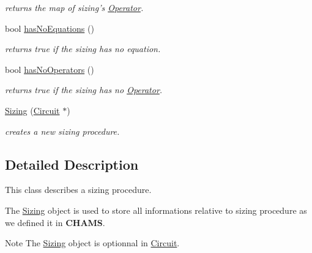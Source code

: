 \begin{DoxyCompactItemize}
\begin{DoxyCompactList}\small\item\em returns the map of sizing's \hyperlink{class_open_chams_1_1_operator}{Operator}. \end{DoxyCompactList}\item 
\hypertarget{class_open_chams_1_1_sizing_a1b6ba7a6c0883f65fa26ad46691946cb}{bool \hyperlink{class_open_chams_1_1_sizing_a1b6ba7a6c0883f65fa26ad46691946cb}{has\-No\-Equations} ()}\label{class_open_chams_1_1_sizing_a1b6ba7a6c0883f65fa26ad46691946cb}

\begin{DoxyCompactList}\small\item\em returns true if the sizing has no equation. \end{DoxyCompactList}\item 
\hypertarget{class_open_chams_1_1_sizing_ac8a299add4fd32ff8bf99c889f4a79a6}{bool \hyperlink{class_open_chams_1_1_sizing_ac8a299add4fd32ff8bf99c889f4a79a6}{has\-No\-Operators} ()}\label{class_open_chams_1_1_sizing_ac8a299add4fd32ff8bf99c889f4a79a6}

\begin{DoxyCompactList}\small\item\em returns true if the sizing has no \hyperlink{class_open_chams_1_1_operator}{Operator}. \end{DoxyCompactList}\item 
\hyperlink{class_open_chams_1_1_sizing_aa1e5f28af7b674134fda04ce64bf1004}{Sizing} (\hyperlink{class_open_chams_1_1_circuit}{Circuit} $\ast$)
\begin{DoxyCompactList}\small\item\em creates a new sizing procedure. \end{DoxyCompactList}\end{DoxyCompactItemize}


\subsection{Detailed Description}
This class describes a sizing procedure.

The \hyperlink{class_open_chams_1_1_sizing}{Sizing} object is used to store all informations relative to sizing procedure as we defined it in {\bfseries C\-H\-A\-M\-S}.

\begin{DoxyNote}{Note}
The \hyperlink{class_open_chams_1_1_sizing}{Sizing} object is optionnal in \hyperlink{class_open_chams_1_1_circuit}{Circuit}. 
\end{DoxyNote}


